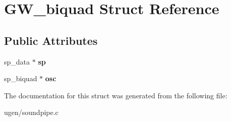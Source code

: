 \hypertarget{structGW__biquad}{}\section{G\+W\+\_\+biquad Struct Reference}
\label{structGW__biquad}
\subsection*{Public Attributes}
\begin{DoxyCompactItemize}
\item 
\hypertarget{structGW__biquad_afa4c673381f9ebf84f82df847889c24c}{}\label{structGW__biquad_afa4c673381f9ebf84f82df847889c24c} 
sp\+\_\+data $\ast$ {\bfseries sp}
\item 
\hypertarget{structGW__biquad_a7c803fef8156136ad4756ce4e459f8e4}{}\label{structGW__biquad_a7c803fef8156136ad4756ce4e459f8e4} 
sp\+\_\+biquad $\ast$ {\bfseries osc}
\end{DoxyCompactItemize}


The documentation for this struct was generated from the following file\+:\begin{DoxyCompactItemize}
\item 
ugen/soundpipe.\+c\end{DoxyCompactItemize}
